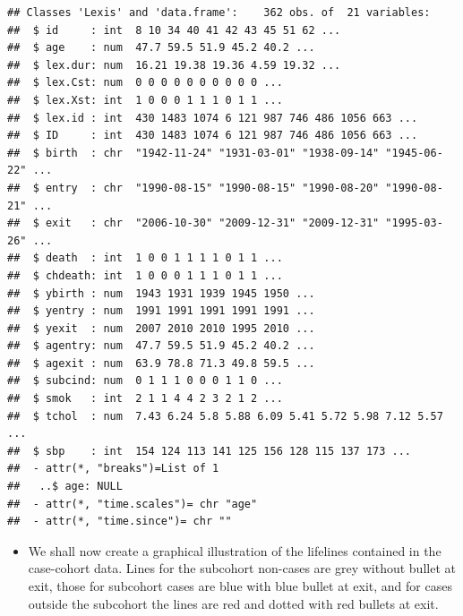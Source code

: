 \documentclass[
]{book}
\newenvironment{Shaded}{\begin{snugshade}}{\end{snugshade}}
\newcommand{\AttributeTok}[1]{\textcolor[rgb]{0.13,0.29,0.53}{#1}}
\newcommand{\DecValTok}[1]{\textcolor[rgb]{0.00,0.00,0.81}{#1}}
\newcommand{\FunctionTok}[1]{\textcolor[rgb]{0.13,0.29,0.53}{\textbf{#1}}}
\newcommand{\NormalTok}[1]{#1}
\newcommand{\SpecialCharTok}[1]{\textcolor[rgb]{0.81,0.36,0.00}{\textbf{#1}}}
\newcommand{\StringTok}[1]{\textcolor[rgb]{0.31,0.60,0.02}{#1}}
\providecommand{\tightlist}{%
  \setlength{\itemsep}{0pt}\setlength{\parskip}{0pt}}
\begin{document}
\begin{verbatim}
## Classes 'Lexis' and 'data.frame':    362 obs. of  21 variables:
##  $ id     : int  8 10 34 40 41 42 43 45 51 62 ...
##  $ age    : num  47.7 59.5 51.9 45.2 40.2 ...
##  $ lex.dur: num  16.21 19.38 19.36 4.59 19.32 ...
##  $ lex.Cst: num  0 0 0 0 0 0 0 0 0 0 ...
##  $ lex.Xst: int  1 0 0 0 1 1 1 0 1 1 ...
##  $ lex.id : int  430 1483 1074 6 121 987 746 486 1056 663 ...
##  $ ID     : int  430 1483 1074 6 121 987 746 486 1056 663 ...
##  $ birth  : chr  "1942-11-24" "1931-03-01" "1938-09-14" "1945-06-22" ...
##  $ entry  : chr  "1990-08-15" "1990-08-15" "1990-08-20" "1990-08-21" ...
##  $ exit   : chr  "2006-10-30" "2009-12-31" "2009-12-31" "1995-03-26" ...
##  $ death  : int  1 0 0 1 1 1 1 0 1 1 ...
##  $ chdeath: int  1 0 0 0 1 1 1 0 1 1 ...
##  $ ybirth : num  1943 1931 1939 1945 1950 ...
##  $ yentry : num  1991 1991 1991 1991 1991 ...
##  $ yexit  : num  2007 2010 2010 1995 2010 ...
##  $ agentry: num  47.7 59.5 51.9 45.2 40.2 ...
##  $ agexit : num  63.9 78.8 71.3 49.8 59.5 ...
##  $ subcind: num  0 1 1 1 0 0 0 1 1 0 ...
##  $ smok   : int  2 1 1 4 4 2 3 2 1 2 ...
##  $ tchol  : num  7.43 6.24 5.8 5.88 6.09 5.41 5.72 5.98 7.12 5.57 ...
##  $ sbp    : int  154 124 113 141 125 156 128 115 137 173 ...
##  - attr(*, "breaks")=List of 1
##   ..$ age: NULL
##  - attr(*, "time.scales")= chr "age"
##  - attr(*, "time.since")= chr ""
\end{verbatim}

\begin{itemize}
\tightlist
\item
  We shall now create a graphical illustration of
  the lifelines contained in the case-cohort data.
  Lines for the subcohort non-cases are grey without bullet at exit,
  those for subcohort cases are blue with blue bullet at exit, and
  for cases outside the subcohort the lines are red and dotted with
  red bullets at exit.
\end{itemize}

\begin{Shaded}
\end{Shaded}
\end{document}
